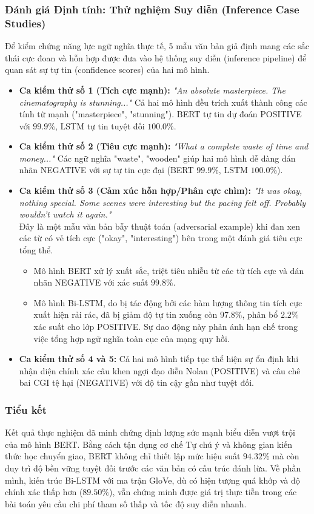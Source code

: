 \documentclass[a4paper]{article}
\theoremstyle{definition}
\begin{document}
\subsubsection{Đánh giá Định tính: Thử nghiệm Suy diễn (Inference Case Studies)}
Để kiểm chứng năng lực ngữ nghĩa thực tế, 5 mẫu văn bản giả định mang các sắc thái cực đoan và hỗn hợp được đưa vào hệ thống suy diễn (inference pipeline) để quan sát sự tự tin (confidence scores) của hai mô hình.

\begin{itemize}
	\item \textbf{Ca kiểm thử số 1 (Tích cực mạnh):} \textit{"An absolute masterpiece. The cinematography is stunning..."} Cả hai mô hình đều trích xuất thành công các tính từ mạnh ("masterpiece", "stunning"). BERT tự tin dự đoán POSITIVE với $99.9\%$, LSTM tự tin tuyệt đối $100.0\%$.
	\item \textbf{Ca kiểm thử số 2 (Tiêu cực mạnh):} \textit{"What a complete waste of time and money..."} Các ngữ nghĩa "waste", "wooden" giúp hai mô hình dễ dàng dán nhãn NEGATIVE với sự tự tin cực đại (BERT $99.9\%$, LSTM $100.0\%$).
	\item \textbf{Ca kiểm thử số 3 (Cảm xúc hỗn hợp/Phân cực chìm):} \textit{"It was okay, nothing special. Some scenes were interesting but the pacing felt off. Probably wouldn't watch it again."} \\
	      Đây là một mẫu văn bản bẫy thuật toán (adversarial example) khi đan xen các từ có vẻ tích cực ("okay", "interesting") bên trong một đánh giá tiêu cực tổng thể.
	      \begin{itemize}
		      \item Mô hình BERT xử lý xuất sắc, triệt tiêu nhiễu từ các từ tích cực và dán nhãn NEGATIVE với xác suất $99.8\%$.
		      \item Mô hình Bi-LSTM, do bị tác động bởi các hàm lượng thông tin tích cực xuất hiện rải rác, đã bị giảm độ tự tin xuống còn $97.8\%$, phân bổ $2.2\%$ xác suất cho lớp POSITIVE. Sự dao động này phản ánh hạn chế trong việc tổng hợp ngữ nghĩa toàn cục của mạng quy hồi.
	      \end{itemize}
	\item \textbf{Ca kiểm thử số 4 và 5:} Cả hai mô hình tiếp tục thể hiện sự ổn định khi nhận diện chính xác câu khen ngợi đạo diễn Nolan (POSITIVE) và câu chê bai CGI tệ hại (NEGATIVE) với độ tin cậy gần như tuyệt đối.
\end{itemize}

\subsubsection{Tiểu kết}
Kết quả thực nghiệm đã minh chứng định lượng sức mạnh biểu diễn vượt trội của mô hình BERT. Bằng cách tận dụng cơ chế Tự chú ý và không gian kiến thức học chuyển giao, BERT không chỉ thiết lập mức hiệu suất $94.32\%$ mà còn duy trì độ bền vững tuyệt đối trước các văn bản có cấu trúc đánh lừa. Về phần mình, kiến trúc Bi-LSTM với ma trận GloVe, dù có hiện tượng quá khớp và độ chính xác thấp hơn ($89.50\%$), vẫn chứng minh được giá trị thực tiễn trong các bài toán yêu cầu chi phí tham số thấp và tốc độ suy diễn nhanh.
\end{document}
